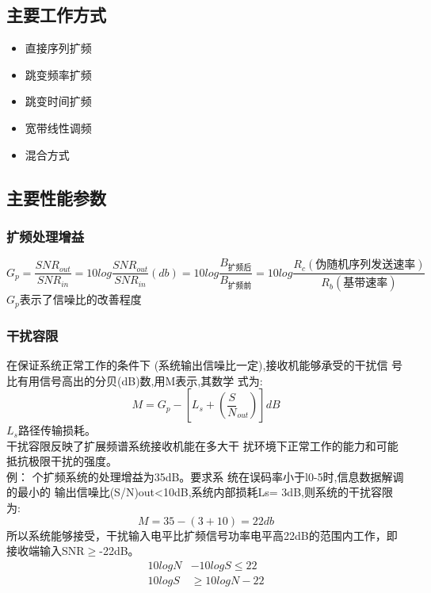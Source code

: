 \subsection{主要工作方式}
\begin{itemize}
	\item 直接序列扩频
	\item 跳变频率扩频
	\item 跳变时间扩频
	\item 宽带线性调频
	\item 混合方式
\end{itemize}
\subsection{主要性能参数}
\subsubsection{扩频处理增益}
\begin{equation}\label{key}
G_p = \frac{SNR_{out}}{SNR_{in}} =10log\frac{SNR_{out}}{SNR_{in}} (db)=  10log\frac{B_{\text{扩频后}}}{B_{\text{扩频前}}} =10log \frac{R_c(\text{伪随机序列发送速率})}{R_b(\text{基带速率})}
\end{equation}
$ G_p $表示了信噪比的改善程度
\subsubsection{干扰容限
}
在保证系统正常工作的条件下
(系统输出信噪比一定),接收机能够承受的干扰信
号比有用信号高出的分贝(dB)数,用M表示,其数学
式为:
\begin{equation}\label{key}
M = G_p - [L_s + (\frac{S}{N}_{out})]dB
\end{equation}
$ L_s $路径传输损耗。\\
干扰容限反映了扩展频谱系统接收机能在多大干
扰环境下正常工作的能力和可能抵抗极限干扰的强度。\\
例：
个扩频系统的处理增益为35dB。要求系
统在误码率小于l0-5时,信息数据解调的最小的
输出信噪比(S/N)out<10dB,系统内部损耗Ls=
3dB,则系统的干扰容限为:
\begin{equation}\label{key}
M = 35 - (3+10) = 22db
\end{equation}
所以系统能够接受，干扰输入电平比扩频信号功率电平高22dB的范围内工作，即接收端输入SNR$\ge$-22dB。
\begin{align*}\label{key}
10logN &- 10logS  \le 22	\\
10logS & \ge 10logN - 22 
\end{align*}
